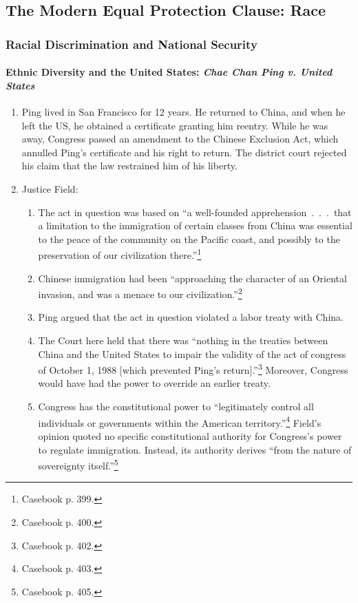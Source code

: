 \subsection{The Modern Equal Protection Clause: Race}

\subsubsection{Racial Discrimination and National Security}

\paragraph{Ethnic Diversity and the United States: \emph{Chae Chan Ping v. 
United States}}

\begin{enumerate}
    \item Ping lived in San Francisco for 12 years. He returned to China, and 
    when he left the US, he obtained a certificate granting him reentry. While 
    he was away, Congress passed an amendment to the Chinese Exclusion Act, 
    which annulled Ping's certificate and his right to return. The district 
    court rejected his claim that the law restrained him of his liberty.
    \item Justice Field:
    \begin{enumerate}
        \item The act in question was based on ``a well-founded 
        apprehension~.~.~.~that a limitation to the immigration of certain 
        classes from China was essential to the peace of the community on the 
        Pacific coast, and possibly to the preservation of our civilization 
        there.''\footnote{Casebook p. 399.}
        \item Chinese immigration had been ``approaching the character of an 
        Oriental invasion, and was a menace to our 
        civilization.''\footnote{Casebook p. 400.}
        \item Ping argued that the act in question violated a labor treaty 
        with China.
        \item The Court here held that there was ``nothing in the treaties 
        between China and the United States to impair the validity of the act 
        of congress of October 1, 1988 [which prevented Ping's 
        return].''\footnote{Casebook p. 402.} Moreover, Congress would have 
        had the power to override an earlier treaty.
        \item Congress has the constitutional power to ``legitimately control 
        all individuals or governments within the American 
        territory.''\footnote{Casebook p.  403.} Field's opinion 
        quoted no specific constitutional authority for Congress's power to 
        regulate immigration. Instead, its authority derives ``from the nature 
        of sovereignty itself.''\footnote{Casebook p. 405.}
    \end{enumerate}
\end{enumerate}
